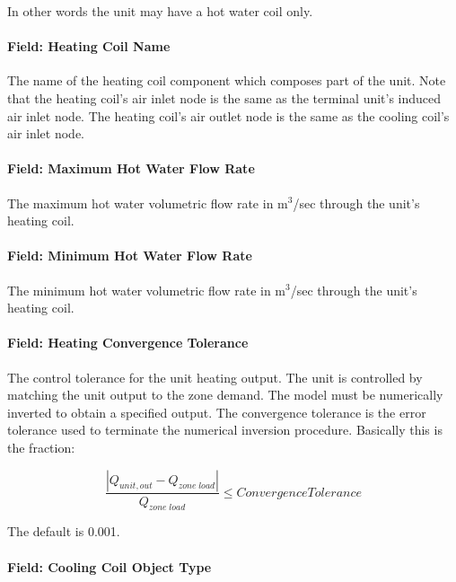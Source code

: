 In other words the unit may have a hot water coil only.

\paragraph{Field: Heating Coil Name}\label{field-heating-coil-name-1}

The name of the heating coil component which composes part of the unit. Note that the heating coil's air inlet node is the same as the terminal unit's induced air inlet node. The heating coil's air outlet node is the same as the cooling coil's air inlet node.

\paragraph{Field: Maximum Hot Water Flow Rate}\label{field-maximum-hot-water-flow-rate}

The maximum hot water volumetric flow rate in m\(^{3}\)/sec through the unit's heating coil.

\paragraph{Field: Minimum Hot Water Flow Rate}\label{field-minimum-hot-water-flow-rate}

The minimum hot water volumetric flow rate in m\(^{3}\)/sec through the unit's heating coil.

\paragraph{Field: Heating Convergence Tolerance}\label{field-heating-convergence-tolerance}

The control tolerance for the unit heating output. The unit is controlled by matching the unit output to the zone demand. The model must be numerically inverted to obtain a specified output. The convergence tolerance is the error tolerance used to terminate the numerical inversion procedure. Basically this is the fraction:

\begin{equation}
\frac{{\left| {{Q_{unit,out}} - {Q_{zone\;load}}} \right|}}{{{Q_{zone\;load}}}} \le ConvergenceTolerance
\end{equation}

The default is 0.001.

\paragraph{Field: Cooling Coil Object Type}\label{field-cooling-coil-object-type}

